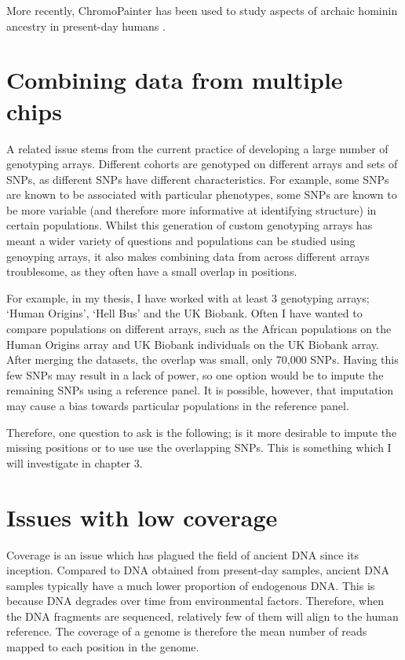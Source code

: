 More recently, ChromoPainter has been used to study aspects of archaic hominin ancestry in present-day humans \cite{JACOBS20191010, teixeira2021widespread}. 

\section{Combining data from multiple chips}

A related issue stems from the current practice of developing a large number of genotyping arrays. Different cohorts are genotyped on different arrays and sets of SNPs, as different SNPs have different characteristics. For example, some SNPs are known to be associated with particular phenotypes, some SNPs are known to be more variable (and therefore more informative at identifying structure) in certain populations. Whilst this generation of custom genotyping arrays has meant a wider variety of questions and populations can be studied using genoyping arrays, it also makes combining data from across different arrays troublesome, as they often have a small overlap in positions.

For example, in my thesis, I have worked with at least 3 genotyping arrays; `Human Origins', `Hell Bus' and the UK Biobank. Often I have wanted to compare populations on different arrays, such as the African populations on the Human Origins array and UK Biobank individuals on the UK Biobank array. After merging the datasets, the overlap was small, only 70,000 SNPs. Having this few SNPs may result in a lack of power, so one option would be to impute the remaining SNPs using a reference panel. It is possible, however, that imputation may cause a bias towards particular populations in the reference panel. 

Therefore, one question to ask is the following; is it more desirable to impute the missing positions or to use use the overlapping SNPs. This is something which I will investigate in chapter 3.

\section{Issues with low coverage}

Coverage is an issue which has plagued the field of ancient DNA since its inception. Compared to DNA obtained from present-day samples, ancient DNA samples typically have a much lower proportion of endogenous DNA. This is because DNA degrades over time from environmental factors. Therefore, when the DNA fragments are sequenced, relatively few of them will align to the human reference. The coverage of a genome is therefore the mean number of reads mapped to each position in the genome. 

